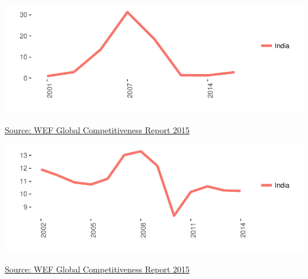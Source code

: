 \documentclass{article}\usepackage[]{graphicx}\usepackage[]{color}
\makeatletter
\def\maxwidth{ %
  \ifdim\Gin@nat@width>\linewidth
    \linewidth
  \else
    \Gin@nat@width
  \fi
}
\makeatother
\begin{document}
\begin{minipage}[c]{0.875\textwidth} %
  \vspace*{0.3cm}
  \begin{minipage}[c]{0.49\textwidth} %


{\centering \includegraphics[width=\maxwidth]{figure/line_chart_Finance1-1} 

}



    \hspace*{0.3cm} \raggedright\footnotesize{\href{http://www.weforum.org/global-competitiveness-report-2015-2016}{Source: WEF Global Competitiveness Report 2015}}
  \end{minipage}
  \begin{minipage}[c]{0.49\textwidth} %


{\centering \includegraphics[width=\maxwidth]{figure/line_chart_Finance2-1} 

}



    \hspace*{0.3cm} \raggedright\footnotesize{\href{http://www.weforum.org/global-competitiveness-report-2015-2016}{Source: WEF Global Competitiveness Report 2015}}
  \end{minipage}
\end{minipage}  
\end{document}
